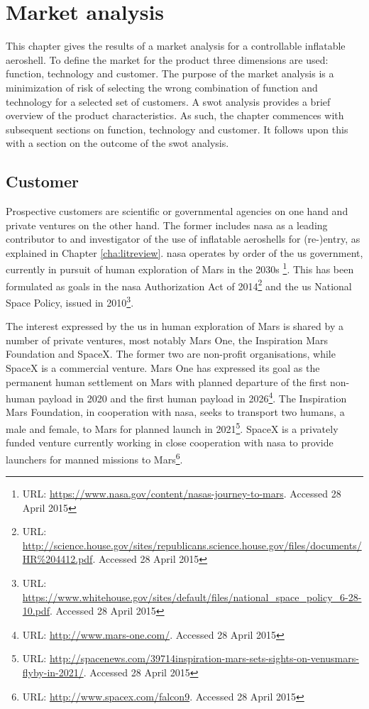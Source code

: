 \section{Market analysis} \label{ch:market}
This chapter gives the results of a market analysis for a controllable inflatable aeroshell. To define the market for the product three dimensions are used: function, technology and customer. The purpose of the market analysis is a minimization of risk of selecting the wrong combination of function and technology for a selected set of customers. A \gls{swot} analysis provides a brief overview of the product characteristics. As such, the chapter commences with subsequent sections on function, technology and customer. It follows upon this with a section on the outcome of the \gls{swot} analysis.

\subsection{Customer}
Prospective customers are scientific or governmental agencies on one hand and private ventures on the other hand. The former includes \gls{nasa} as a leading contributor to and investigator of the use of inflatable aeroshells for (re-)entry, as explained in Chapter \ref{cha:litreview}. \gls{nasa} operates by order of the \gls{us} government, currently in pursuit of human exploration of Mars in the 2030s \footnote{URL: \url{https://www.nasa.gov/content/nasas-journey-to-mars}.  Accessed 28 April 2015}. This has been formulated as goals in the \gls{nasa} Authorization Act of 2014\footnote{URL: \url{http://science.house.gov/sites/republicans.science.house.gov/files/documents/HR\%204412.pdf}. Accessed 28 April 2015} and the \gls{us} National Space Policy, issued in 2010\footnote{URL: \url{https://www.whitehouse.gov/sites/default/files/national\_space\_policy\_6-28-10.pdf}. Accessed 28 April 2015}.

The interest expressed by the \gls{us} in human exploration of Mars is shared by a number of private ventures, most notably Mars One, the Inspiration Mars Foundation and SpaceX. The former two are non-profit organisations, while SpaceX is a commercial venture. Mars One has expressed its goal as the permanent human settlement on Mars with planned departure of the first non-human payload in 2020 and the first human payload in 2026\footnote{URL: \url{http://www.mars-one.com/}. Accessed 28 April 2015}. The Inspiration Mars Foundation, in cooperation with \gls{nasa}, seeks to transport two humans, a male and female, to Mars for planned launch in 2021\footnote{URL: \url{http://spacenews.com/39714inspiration-mars-sets-sights-on-venusmars-flyby-in-2021/}. Accessed 28 April 2015}. SpaceX is a privately funded venture currently working in close cooperation with \gls{nasa} to provide launchers for manned missions to Mars\footnote{URL: \url{http://www.spacex.com/falcon9}. Accessed 28 April 2015}.

